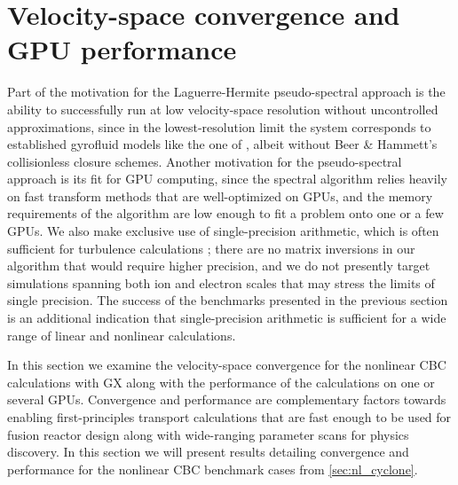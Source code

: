 \documentclass{jpp}
\newcommand{\GX}{{GX}\xspace}
\begin{document}
\section{Velocity-space convergence and GPU performance}
\label{sec:convergence}

Part of the motivation for the Laguerre-Hermite pseudo-spectral approach is the ability to successfully run at low velocity-space resolution without uncontrolled approximations, since in the lowest-resolution limit the system corresponds to established gyrofluid models like the one of \citet{Beer1996}{\color{black}, albeit without Beer \& Hammett's collisionless closure schemes}.  
Another motivation for the pseudo-spectral approach is its fit for GPU computing, since the spectral algorithm relies heavily on fast transform methods that are well-optimized on GPUs, and the memory requirements of the algorithm are low enough to fit a problem onto one or a few GPUs. We also {\color{black} make exclusive use of} single-precision arithmetic, which is often sufficient for turbulence calculations \citep{Maurer2020}; there are no matrix inversions in our algorithm that would require higher precision{, \color{black} and we do not presently target simulations spanning both ion and electron scales that may stress the limits of single precision. The success of the benchmarks presented in the previous section is an additional indication that single-precision arithmetic is sufficient for a wide range of linear and nonlinear calculations.}

In this section we examine the velocity-space convergence for the nonlinear CBC calculations with \GX along with the performance of the calculations on one or several GPUs. Convergence and performance are complementary factors towards enabling first-principles transport calculations that are fast enough to be used for fusion reactor design {\color{black} along with wide-ranging parameter scans for physics discovery}. In this section we will present results detailing convergence and performance for the nonlinear CBC benchmark cases from \cref{sec:nl_cyclone}.
\end{document}
